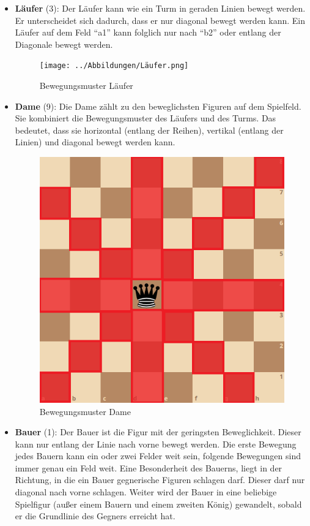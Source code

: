 \documentclass[a4paper,12pt]{article}
\begin{document}
\begin{itemize}
	\item 
		\textbf{Läufer} (3): Der
		Läufer kann wie ein Turm in geraden Linien bewegt werden. Er
		unterscheidet sich dadurch, dass er nur diagonal bewegt werden kann. Ein
		Läufer auf dem Feld ``a1'' kann folglich nur nach ``b2'' oder entlang
		der Diagonale bewegt werden. 
		
		\begin{figure}
			\centering
			\texttt{[image: ../Abbildungen/Läufer.png]} 
			\caption{Bewegungsmuster Läufer}
		\end{figure}
	
	\item 
		\textbf{Dame} (9): Die Dame zählt zu den beweglichsten Figuren auf dem
		Spielfeld. Sie kombiniert die Bewegungsmuster des Läufers und des Turms.
		Das bedeutet, dass sie horizontal (entlang der Reihen), vertikal
		(entlang der Linien) und diagonal bewegt werden kann.
		
		\begin{figure}
			\centering
			\includegraphics{../Abbildungen/Dame.png} 
			\caption{Bewegungsmuster Dame}
		\end{figure}
	
	\item
		\textbf{Bauer} (1): Der
		Bauer ist die Figur mit der geringsten Beweglichkeit. Dieser kann nur
		entlang der Linie nach vorne bewegt werden. Die erste Bewegung jedes
		Bauern kann ein oder zwei Felder weit sein, folgende Bewegungen sind
		immer genau ein Feld weit. Eine Besonderheit des Bauerns, liegt in der
		Richtung, in die ein Bauer gegnerische Figuren schlagen darf. Dieser
		darf nur diagonal nach vorne schlagen. Weiter wird der Bauer in eine
		beliebige Spielfigur (außer einem Bauern und einem zweiten König)
		gewandelt, sobald er die Grundlinie des Gegners erreicht hat.
		

\end{itemize}
\end{document}
